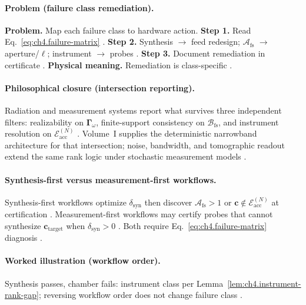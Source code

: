 \paragraph{Problem (failure class remediation).}
\textbf{Problem.} Map each failure class to hardware action.
\textbf{Step 1.} Read Eq.~\eqref{eq:ch4.failure-matrix} \cite{harrington2001,stratton1941}.
\textbf{Step 2.} Synthesis \(\to\) feed redesign; \(\mathcal{A}_{\mathrm{fs}}\) \(\to\) aperture/\(\ell\); instrument \(\to\) probes \cite{hansen1988,devaney2004}.
\textbf{Step 3.} Document remediation in certificate \cite{jackson1999,collin2001}.
\textbf{Physical meaning.} Remediation is class-specific \cite{stratton1941,harrington2001}.

\paragraph{Philosophical closure (intersection reporting).}
Radiation and measurement systems report what survives three independent filters: realizability on \(\boldsymbol{\Gamma}_\omega\), finite-support consistency on
\(\mathcal{B}_{\mathrm{fs}}\), and instrument resolution on \(\mathcal{E}_{\mathrm{acc}}^{(N)}\) \cite{stratton1941,harrington2001,hansen1988,jackson1999,devaney2004}.
Volume~I supplies the deterministic narrowband architecture for that intersection; noise, bandwidth, and tomographic readout extend the same rank logic under
stochastic measurement models \cite{harrington2001,devaney2004,collin2001}.

\paragraph{Synthesis-first versus measurement-first workflows.}
Synthesis-first workflows optimize \(\delta_{\mathrm{syn}}\) then discover \(\mathcal{A}_{\mathrm{fs}}>1\) or \(\mathbf{c}\notin\mathcal{E}_{\mathrm{acc}}^{(N)}\) at
certification \cite{harrington2001,stratton1941,hansen1988,devaney2004,jackson1999,collin2001}. Measurement-first workflows may certify probes that cannot synthesize
\(\mathbf{c}_{\mathrm{target}}\) when \(\delta_{\mathrm{syn}}>0\) \cite{stratton1941,harrington2001}. Both require Eq.~\eqref{eq:ch4.failure-matrix} diagnosis
\cite{devaney2004,hansen1988,collin2001}.

\paragraph{Worked illustration (workflow order).}
Synthesis passes, chamber fails: instrument class per Lemma~\ref{lem:ch4.instrument-rank-gap}; reversing workflow order does not change failure class
\cite{harrington2001,stratton1941,hansen1988,devaney2004,jackson1999}.

